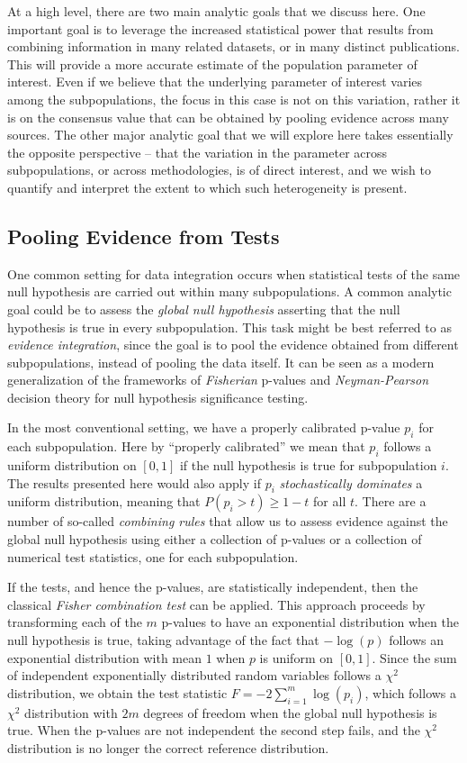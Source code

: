 At a high level, there are two main analytic goals that we discuss here. One important goal is to leverage the increased statistical power that results from combining information in many related datasets, or in many distinct publications.  This will provide a more accurate estimate of the population parameter of interest. Even if we believe that the underlying parameter of interest varies among the subpopulations, the focus in this case is not on this variation, rather it is on the consensus value that can be obtained by pooling evidence across many sources. The other major analytic goal that we will explore here takes essentially the opposite perspective -- that the variation in the parameter across subpopulations, or across methodologies, is of direct interest, and we wish to quantify and interpret the extent to which such heterogeneity is present.

\subsection{Pooling Evidence from Tests}

One common setting for data integration occurs when statistical tests of the same null hypothesis are carried out within many subpopulations. A common analytic goal could be to assess the \textit{global null hypothesis} asserting that the null hypothesis is true in every subpopulation. This task might be best referred to as \textit{evidence integration}, since the goal is to pool the evidence obtained from different subpopulations, instead of pooling the data itself.  It can be seen as a modern generalization of the frameworks of {\em Fisherian} p-values and {\em Neyman-Pearson} decision theory for null hypothesis significance testing.

In the most conventional setting, we have a properly calibrated p-value $p_i$ for each subpopulation. Here by ``properly calibrated'' we mean that $p_i$ follows a uniform distribution on $[0, 1]$ if the null hypothesis is true for subpopulation $i$. The results presented here would also apply if $p_i$ {\em stochastically dominates} a uniform distribution, meaning that $P(p_i > t) \ge 1 - t$ for all $t$. There are a number of so-called \textit{combining rules} that allow us to assess evidence against the global null hypothesis using either a collection of p-values or a collection of numerical test statistics, one for each subpopulation.

If the tests, and hence the p-values, are statistically independent, then the classical \textit{Fisher combination test} can be applied. This approach proceeds by transforming each of the $m$ p-values to have an exponential distribution when the null hypothesis is true, taking advantage of the fact that $-\log(p)$ follows an exponential distribution with mean $1$ when $p$ is uniform on $[0, 1]$. Since the sum of independent exponentially distributed random variables follows a $\chi^2$ distribution, we obtain the test statistic $F = -2\sum_{i=1}^m \log(p_i)$, which follows a $\chi^2$ distribution with $2m$ degrees of freedom when the global null hypothesis is true. When the p-values are not independent the second step fails, and the $\chi^2$ distribution is no longer the correct reference distribution.

